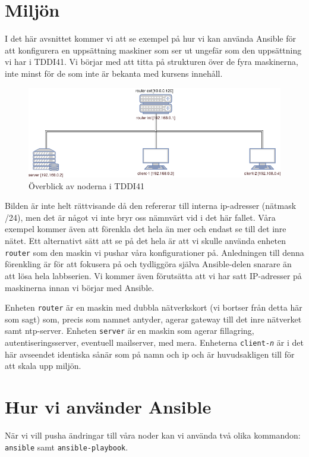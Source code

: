 \section{Miljön}
I det här avsnittet kommer vi att se exempel på hur vi kan använda Ansible för att konfigurera en uppsättning maskiner som ser ut ungefär som den uppsättning vi har i TDDI41. Vi börjar med att titta på strukturen över de fyra maskinerna, inte minst för de som inte är bekanta med kursens innehåll.

\begin{figure}[H]
  \includegraphics[scale=0.5]{./bilder/tddi41-overview.png}
  \caption{Överblick av noderna i TDDI41}
\end{figure}

Bilden är inte helt rättvisande då den refererar till interna ip-adresser (nätmask /24), 
men det är något vi inte bryr oss nämnvärt vid i det här fallet. Våra exempel kommer även
att förenkla det hela än mer och endast se till det inre nätet. Ett alternativt sätt att
se på det hela är att vi skulle använda enheten \texttt{router} som den maskin vi pushar
våra konfigurationer på. Anledningen till denna förenkling är för att fokusera på och 
tydliggöra själva Ansible-delen snarare än att lösa hela labbserien.
Vi kommer även förutsätta att vi har satt IP-adresser på maskinerna innan vi börjar med Ansible.

Enheten \texttt{router} är en maskin med dubbla nätverkskort (vi bortser från detta här som sagt) som,
precis som namnet antyder, agerar gateway till det inre nätverket samt ntp-server.
Enheten \texttt{server} är en maskin som agerar fillagring, autentiseringsserver, eventuell mailserver, med mera.
Enheterna \texttt{client-\emph{n}} är i det här avseendet identiska sånär som på namn och ip och
är huvudsakligen till för att skala upp miljön.

\section{Hur vi använder Ansible}
När vi vill pusha ändringar till våra noder kan vi använda två olika kommandon: \texttt{ansible} samt \texttt{ansible-playbook}.

